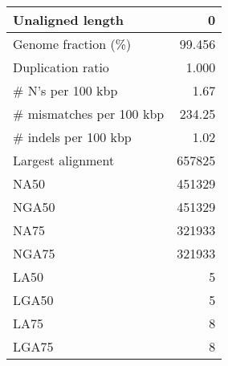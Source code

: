 \documentclass[12pt,a4paper]{article}
\begin{document}
\begin{table}[ht]
\begin{center}
\begin{tabular}{|l*{1}{|r}|}
Unaligned length & 0 \\ \hline
Genome fraction (\%) & 99.456 \\ \hline
Duplication ratio & 1.000 \\ \hline
\# N's per 100 kbp & 1.67 \\ \hline
\# mismatches per 100 kbp & 234.25 \\ \hline
\# indels per 100 kbp & 1.02 \\ \hline
Largest alignment & 657825 \\ \hline
NA50 & 451329 \\ \hline
NGA50 & 451329 \\ \hline
NA75 & 321933 \\ \hline
NGA75 & 321933 \\ \hline
LA50 & 5 \\ \hline
LGA50 & 5 \\ \hline
LA75 & 8 \\ \hline
LGA75 & 8 \\ \hline
\end{tabular}
\end{center}
\end{table}
\end{document}
